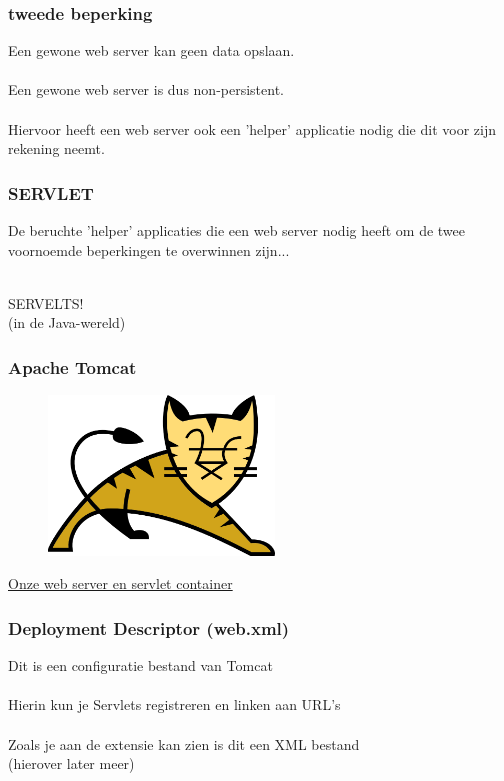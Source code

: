 \documentclass{beamer}
\begin{document}
\begin{frame}

\frametitle{tweede beperking}

{\Large Een gewone web server kan geen data opslaan.\\~\\Een gewone web server
is dus non-persistent. \\~\\Hiervoor heeft een web server ook een 'helper'
applicatie nodig die dit voor zijn rekening neemt.}

\end{frame}


\begin{frame}

\frametitle{SERVLET}
{\Large 
De beruchte 'helper' applicaties die een web server nodig heeft om de
twee voornoemde beperkingen te overwinnen zijn...}\\~\\

\begin{center}
\textbf{}{\Huge SERVELTS!}\\
{\tiny(in de Java-wereld)}
\end{center}

\end{frame}


\begin{frame}

\frametitle{Apache Tomcat}

\begin{figure}

\includegraphics[width=170pt]{Tomcat-logo.png}

\end{figure}

\begin{center}
{\LARGE \href{http://tomcat.apache.org/}{Onze web server en servlet container}}
\end{center}

\end{frame}


\begin{frame}

\frametitle{Deployment Descriptor (web.xml)}

{\Large Dit is een configuratie bestand van Tomcat\\~\\

Hierin kun je Servlets registreren en linken aan URL's\\~\\

Zoals je aan de extensie kan zien is dit een XML bestand\\(hierover later meer)}

\end{frame}
\end{document}
